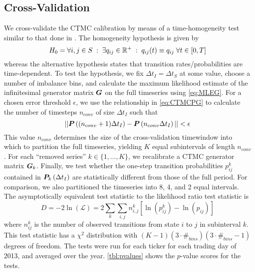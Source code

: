 \subsection{Cross-Validation}
We cross-validate the CTMC calibration by means of a time-homogeneity test similar to that done in \citet{Tan02}. The homogeneity hypothesis is given by \citep{Weiss10}
\begin{equation}
H_0 = \forall i,j \in S \; : \; \exists q_{ij} \in \mathbb{R}^+ \; : \; q_{ij}(t) \equiv q_{ij} \; \forall t \in [0,T]
\end{equation}
whereas the alternative hypothesis states that transition rates/probabilities are time-dependent. To test the hypothesis, we fix $\Delta t_I = \Delta t_S$ at some value, choose a number of imbalance bins, and calculate the maximum likelihood estimate of the infinitesimal generator matrix $\boldsymbol{G}$ on the full timeseries using \eqref{eq:MLEG}. For a chosen error threshold $\epsilon$, we use the relationship in \eqref{eq:CTMCPG} to calculate the number of timesteps $n_{conv}$ of size $\Delta t_I$ such that
\begin{equation}\label{eq:crossvalidnconv}
|| \boldsymbol{P}\left((n_{conv}+1)\Delta t_I \right) - \boldsymbol{P} \left( n_{conv}\Delta t_I \right) || < \epsilon
\end{equation}
This value $n_{conv}$ determines the size of the cross-validation timewindow into which to partition the full timeseries, yielding $K$ equal subintervals of length $n_{conv}$. For each ``removed series'' $k \in \{ 1,\dots,K \}$, we recalibrate a CTMC generator matrix $\boldsymbol{G}_{k}$. Finally, we test whether the one-step transition probabilities $p_{ij}^k$ contained in $\boldsymbol{P}_k \left(\Delta t_I \right)$ are statistically different from those of the full period. For comparison, we also partitioned the timeseries into 8, 4, and 2 equal intervals. The asymptotically equivalent test statistic to the likelihood ratio test statistic is
\begin{equation}
D = -2 \ln (\mathcal{L})  = 2 \sum_k \sum_{i,j} n_{i,j}^k \left[ \ln(p_{ij}^k)  - \ln(p_{ij})   \right]
\end{equation}
where $n_{ij}^k$ is the number of observed transitions from state $i$ to $j$ in subinterval $k$. This test statistic has a $\chi^2$ distribution with $(K-1)(3 \cdot \#_{bins})(3 \cdot \#_{bins} - 1)$ degrees of freedom. The tests were run for each ticker for each trading day of 2013, and averaged over the year. \autoref{tbl:pvalues} shows the $p$-value scores for the tests.

